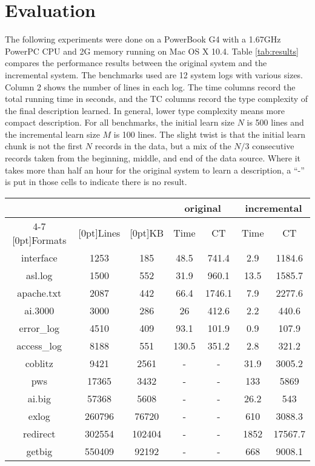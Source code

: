\section{Evaluation}
\label{sec:eval}
The following experiments were done on a PowerBook G4 with a 1.67GHz PowerPC
CPU and 2G memory running on Mac OS X 10.4. 
Table \ref{tab:results} compares the performance results between
the original \learnpads{} system and the incremental system. 
The benchmarks used are 12 system logs with various sizes. Column 2
shows the number of lines in each log. The time columns record the total
running time in seconds, and the TC columns record the type complexity
of the final description learned. In general, lower type complexity means
more compact description. For all benchmarks, the initial learn size $N$ is 500 lines 
and the incremental learn size $M$ is 100 lines. 
The slight twist is that the initial learn chunk is not the first $N$ records in the
data, but a mix of the $N/3$ consecutive records taken from the beginning, middle,
and end of the data source. 
Where it takes more than half an hour for the original \learnpads{}
system to learn a description, a ``-'' is put in those cells to 
indicate there is no result.

\begin{table*}[th]
\begin{center}
\begin{tabular}{|c|c|c|c|c|c|c|}\hline
& & & \multicolumn{2}{|c|}{original} & \multicolumn{2}{|c|}{incremental} \\ \cline{4-7}
\raisebox{1.5ex}[0pt]{Formats} & \raisebox{1.5ex}[0pt]{Lines} & \raisebox{1.5ex}[0pt]{KB} & 
	Time & CT & Time & CT \\ \hline \hline
interface & 1253&185		& 48.5	& 741.4	& 2.9	& 1184.6 \\ \hline
asl.log  &	1500&552	& 31.9	& 960.1	& 13.5 	& 1585.7 \\ \hline
apache.txt  &	2087&442	& 66.4 & 1746.1 & 7.9 	& 2277.6 \\ \hline
ai.3000	&	3000&286	& 26	& 412.6	& 2.2	& 440.6	\\ \hline
error\_log  &	4510&409	& 93.1	& 101.9	& 0.9	& 107.9 \\ \hline
access\_log  &	8188&551 	& 130.5	& 351.2	& 2.8	& 321.2	\\ \hline
coblitz	     & 9421&2561   & -	& -	& 31.9 & 3005.2 \\ \hline
pws	&	 17365&3432	& -	& - 	& 133  & 5869 \\ \hline
ai.big	&	57368&5608	& -	& -	& 26.2	& 543 \\ \hline
exlog & 260796&76720 	& -	& -	& 610 & 3088.3 \\ \hline
redirect & 302554&102404 & -	& -	& 1852 & 17567.7 \\ \hline
getbig & 550409&92192   & -	& -	& 668 & 9008.1 \\ \hline
\end{tabular}
\caption{Execution times (secs) and type complexity (bits)} 
\label{tab:results}
\end{center}
\end{table*}


